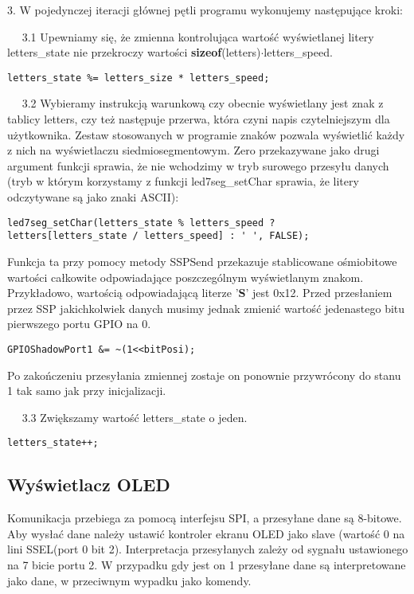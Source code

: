 \documentclass[a4paper,12pt,twoside]{article}
\theoremstyle{plain}
\theoremstyle{definition}
\theoremstyle{remark}
\begin{document}
3. W pojedynczej iteracji głównej pętli programu wykonujemy następujące kroki:

$\quad$ 3.1 Upewniamy się, że zmienna kontrolująca wartość wyświetlanej litery letters\_state nie przekroczy wartości \textbf{sizeof}(letters)$\cdot$letters\_speed.
\begin{verbatim}
letters_state %= letters_size * letters_speed;
\end{verbatim}

$\quad$ 3.2 Wybieramy instrukcją warunkową czy obecnie wyświetlany jest znak z tablicy letters, czy też następuje przerwa, która czyni napis czytelniejszym dla użytkownika. Zestaw stosowanych w programie znaków pozwala wyświetlić każdy z nich na wyświetlaczu siedmiosegmentowym. Zero przekazywane jako drugi argument funkcji sprawia, że nie wchodzimy w tryb surowego przesyłu danych (tryb w którym korzystamy z funkcji led7seg\_setChar sprawia, że litery odczytywane są jako znaki ASCII):
\begin{verbatim}
led7seg_setChar(letters_state % letters_speed ?
letters[letters_state / letters_speed] : ' ', FALSE);
\end{verbatim}
Funkcja ta przy pomocy metody SSPSend przekazuje stablicowane ośmiobitowe wartości całkowite odpowiadające poszczególnym wyświetlanym znakom. Przykładowo, wartością odpowiadającą literze '\textbf{S}' jest 0x12. Przed przesłaniem przez SSP jakichkolwiek danych musimy jednak zmienić wartość jedenastego bitu pierwszego portu GPIO na 0. 
\begin{verbatim}
GPIOShadowPort1 &= ~(1<<bitPosi);
\end{verbatim}
Po zakończeniu przesyłania zmiennej zostaje on ponownie przywrócony do stanu 1 tak samo jak przy inicjalizacji.

$\quad$ 3.3 Zwiększamy wartość letters\_state o jeden.
\begin{verbatim}
letters_state++;
\end{verbatim}
\subsection{Wyświetlacz OLED}

Komunikacja przebiega za pomocą interfejsu SPI, a przesyłane dane są 8-bitowe. 
Aby wysłać dane należy ustawić kontroler ekranu OLED jako slave (wartość 0 na lini SSEL(port 0 bit 2).
Interpretacja przesyłanych zależy od sygnału ustawionego na 7 bicie portu 2. W przypadku gdy
jest on 1 przesyłane dane są interpretowane jako dane, w przeciwnym wypadku jako komendy. 
\end{document}
